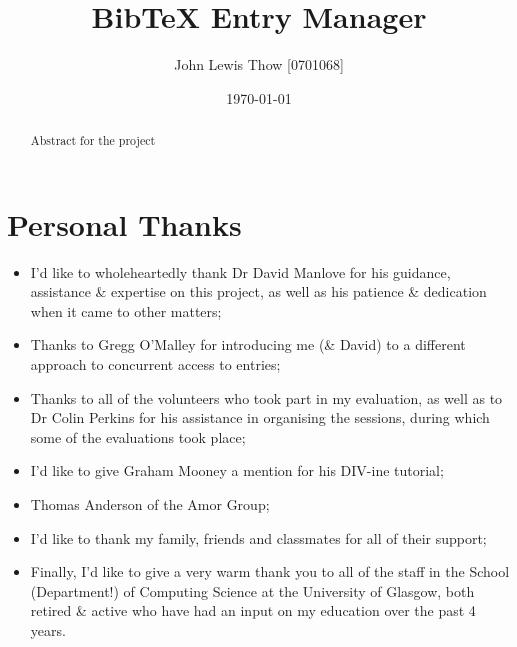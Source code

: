 \documentclass{l4proj}
\newcommand{\BibTeX}{B{\sc ib}\TeX}
\newcommand{\bibtex}{\BibTeX}
\begin{document}
\title{\bibtex{} Entry Manager}
\author{John Lewis Thow [0701068]}
\date{\today}
\maketitle

\begin{abstract}
Abstract for the project
\end{abstract}

\newpage
\section*{Personal Thanks}
\begin{itemize}
\item I'd like to wholeheartedly thank Dr David Manlove for his guidance, assistance \& expertise on this project, as well as his patience \& dedication when it came to other matters;
\item Thanks to Gregg O'Malley for introducing me (\& David) to a different approach to concurrent access to entries;
\item Thanks to all of the volunteers who took part in my evaluation, as well as to Dr Colin Perkins for his assistance in organising the sessions, during which some of the evaluations took place;
\item I'd like to give Graham Mooney a mention for his DIV-ine tutorial;
\item Thomas Anderson of the Amor Group;
\item I'd like to thank my family, friends and classmates for all of their support;
\item Finally, I'd like to give a very warm thank you to all of the staff in the School (Department!) of Computing Science at the University of Glasgow, both retired \& active who have had an input on my education over the past 4 years.
\end{itemize}
\end{document}
